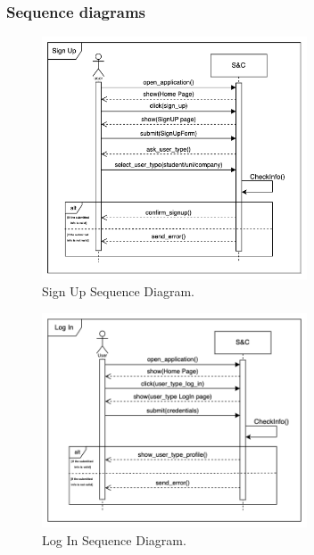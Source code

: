 \subsubsection{Sequence diagrams}

\begin{figure}[H]
\centering
\includegraphics[width=0.7\textwidth]{Images/Sign_Up_Sequence_Diagram (5).png}
\caption{\label{fig:metamodel9}Sign Up Sequence Diagram.}
\end{figure}

\begin{figure}[H]
\centering
\includegraphics[width=0.7\textwidth]{Images/Log_In_Sequence_Diagram.png}
\caption{\label{fig:metamodel9}Log In Sequence Diagram.}
\end{figure}

